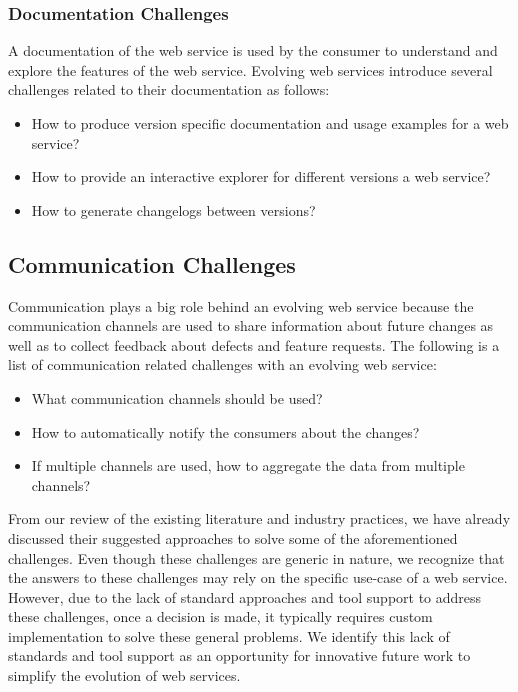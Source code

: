 \documentclass[runningheads,a4paper]{llncs}
\begin{document}
\subsubsection{Documentation Challenges} %
\label{ssub:documentation_challenges}
A documentation of the web service is used by the consumer to understand and explore the features of the web service. Evolving web services introduce several challenges related to their documentation as follows:
\begin{itemize}
  \item How to produce version specific documentation and usage examples for a web service?
  \item How to provide an interactive explorer for different versions a web service?
  \item How to generate changelogs between versions?
\end{itemize}

\subsection{Communication Challenges} %
\label{sub:communication_challenges}
Communication plays a big role behind an evolving web service because the communication channels are used to share information about future changes as well as to collect feedback about defects and feature requests. The following is a list of communication related challenges with an evolving web service:
\begin{itemize}
  \item What communication channels should be used?
  \item How to automatically notify the consumers about the changes?
  \item If multiple channels are used, how to aggregate the data from multiple channels?
\end{itemize}


From our review of the existing literature and industry practices, we have already discussed their suggested approaches to solve some of the aforementioned challenges. Even though these challenges are generic in nature, we recognize that the answers to these challenges may rely on the specific use-case of a web service. However, due to the lack of standard approaches and tool support to address these challenges, once a decision is made, it typically requires custom implementation to solve these general problems. We identify this lack of standards and tool support as an opportunity for innovative future work to simplify the evolution of web services.
\end{document}
